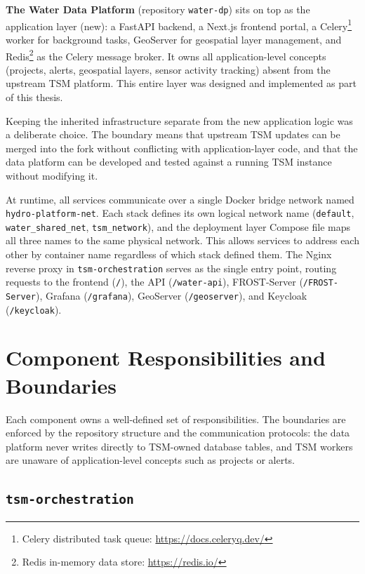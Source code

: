 \textbf{The Water Data Platform} (repository \texttt{water-dp}) sits on top as the application layer (new): a FastAPI backend, a Next.js frontend portal,
a Celery\footnote{Celery distributed task queue: \url{https://docs.celeryq.dev/}} worker for background tasks, GeoServer for geospatial layer management, and Redis\footnote{Redis in-memory data store: \url{https://redis.io/}} as
the Celery message broker. It owns all application-level concepts (projects,
alerts, geospatial layers, sensor activity tracking) absent from the upstream TSM platform.
This entire layer was designed and implemented as part of this thesis.

Keeping the inherited infrastructure separate from the new application logic was
a deliberate choice. The boundary means that upstream TSM updates
can be merged into the fork without conflicting with application-layer code, and that
the data platform can be developed and tested against a running TSM instance without modifying
it.

At runtime, all services communicate over a single Docker bridge network named
\texttt{hydro-platform-net}. Each stack defines its own logical network name
(\texttt{default}, \texttt{water\_shared\_net}, \texttt{tsm\_network}), and the
deployment layer Compose file maps all three names to the same physical network.
This allows services to address each other by container name regardless of which stack
defined them. The Nginx reverse proxy in \texttt{tsm-orchestration} serves as the single
entry point, routing requests to the frontend (\texttt{/}), the API (\texttt{/water-api}),
FROST-Server (\texttt{/FROST-Server}), Grafana (\texttt{/grafana}), GeoServer
(\texttt{/geoserver}), and Keycloak (\texttt{/keycloak}).

\section{Component Responsibilities and Boundaries}
\label{sec:arch-components}

Each component owns a well-defined set of responsibilities. The boundaries are enforced by
the repository structure and the communication protocols: the data platform never writes
directly to TSM-owned database tables, and TSM workers are unaware of application-level
concepts such as projects or alerts.

\subsection{\texttt{tsm-orchestration}}
\label{sec:arch-components-tsm}

